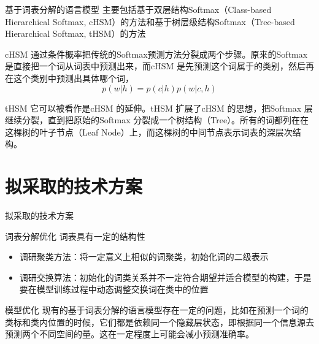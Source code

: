 \documentclass[14pt]{Bredelebeamer}
\begin{document}
\begin{frame}{基于词表分解的语言模型}
    主要包括基于双层结构Softmax（Class-based Hierarchical Softmax, cHSM）的方法和基于树层级结构Softmax（Tree-based Hierarchical Softmax, tHSM）的方法
    \pause
    \begin{block}{cHSM}
    通过条件概率把传统的Softmax预测方法分裂成两个步骤。原来的Softmax 是直接把一个词从词表中预测出来，而cHSM 是先预测这个词属于的类别，然后再在这个类别中预测出具体哪个词，
    \begin{equation}
    \label{eq:cHSM}
	p(w|h)=p(c|h)p(w|c,h)
    \end{equation}

    \end{block}
    \pause
    \begin{block}{tHSM}
    它可以被看作是cHSM 的延伸。tHSM 扩展了cHSM 的思想，把Softmax 层继续分裂，直到把原始的Softmax 分裂成一个树结构（Tree）。所有的词都列在在这棵树的叶子节点（Leaf Node）上，而这棵树的中间节点表示词表的深层次结构。
    \end{block}
\end{frame}



\section{拟采取的技术方案}

\begin{frame}{拟采取的技术方案}
\begin{block}{词表分解优化}
词表具有一定的结构性
\begin{itemize}
\item 调研聚类方法：将一定意义上相似的词聚类，初始化词的二级表示
\item 调研交换算法：初始化的词类关系并不一定符合期望并适合模型的构建，于是要在模型训练过程中动态调整交换词在类中的位置
\end{itemize}
\end{block}
\begin{block}{模型优化}
现有的基于词表分解的语言模型存在一定的问题，比如在预测一个词的类标和类内位置的时候，它们都是依赖同一个隐藏层状态，即根据同一个信息源去预测两个不同空间的量。这在一定程度上可能会减小预测准确率。
\end{block}
\end{frame}
\end{document}
